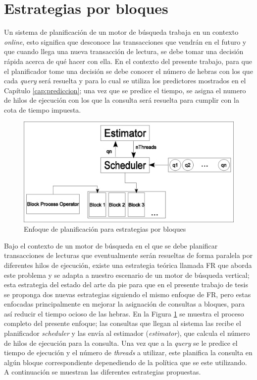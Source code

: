 \section{Estrategias por bloques}
\label{scheduling:bloques}
Un sistema de planificación de un motor de búsqueda trabaja en un contexto \textit{online}, esto significa que desconoce las transacciones que vendrán en el futuro y que cuando llega una nueva transacción de lectura, se debe tomar una decisión rápida acerca de qué hacer con ella. En el contexto del presente trabajo, para que el planificador tome una decisión se debe conocer el número de hebras con los que cada \textit{query} será resuelta y para lo cual se utiliza los predictores mostrados en el Capítulo \ref{cap:prediccion}; una vez que se predice el tiempo, se asigna el numero de hilos de ejecución con los que la consulta será resuelta para cumplir con la cota de tiempo impuesta.

\begin{figure}[!th]
\centering
\includegraphics[scale=.75]{images/scheduler_bloques.eps}
\caption{Enfoque de planificación para estrategias por bloques}
\label{fig:schedulerbloques}
\end{figure}  

Bajo el contexto de un motor de búsqueda en el que se debe planificar transacciones de lecturas que eventualmente serán resueltas de forma paralela por diferentes hilos de ejecución, existe una estrategia teórica llamada FR que aborda este problema \citep{Ye:2007} y se adapta a nuestro escenario de un motor de búsqueda vertical; esta estrategia del estado del arte da pie para que en el presente trabajo de tesis se proponga dos nuevas estrategias siguiendo el mismo enfoque de FR, pero estas enfocadas principalmente en mejorar la asignación de consultas a bloques, para así reducir el tiempo ocioso de las hebras. 
En la Figura \ref{fig:schedulerbloques} se muestra el proceso completo del presente enfoque; las consultas que llegan al sistema las recibe el planificador \textit{scheduler} y las envía al estimador (\textit{estimator}), que calcula el número de hilos de ejecución para la consulta. Una vez que a la \textit{query} se le predice el tiempo de ejecución y el número de \textit{threads} a utilizar, este planifica la consulta en algún bloque correspondiente depenediendo de la política que se este utilizando. A continuación se muestran las diferentes estrategias propuestas. 

